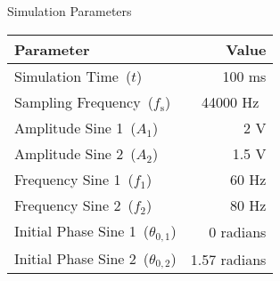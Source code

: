 \centering
\caption{Simulation Parameters}
\label{tb:params}
\setlength{\tabcolsep}{25pt}
\def\arraystretch{1.5}
\begin{threeparttable}
    \begin{tabular}{@{}lr@{}}
        \toprule
        \textbf{Parameter} & \textbf{Value}                                                       \\
        \midrule
        Simulation Time~($t$)                             & 100 ms                                \\
        Sampling Frequency~($f_\text{s}$)                 & 44000 Hz~\cite{Roy2002}               \\
        Amplitude Sine 1~($A_1$)                          & 2 V                                   \\
        Amplitude Sine 2~($A_2$)                          & 1.5 V                                 \\
        Frequency Sine 1~($f_1$)                          & 60 Hz                                 \\
        Frequency Sine 2~($f_2$)                          & 80 Hz                                 \\
        Initial Phase Sine 1~($\theta_{0,1}$)             & 0 radians                             \\
        Initial Phase Sine 2~($\theta_{0,2}$)             & 1.57 radians                          \\
        \bottomrule
    \end{tabular}
\end{threeparttable}
